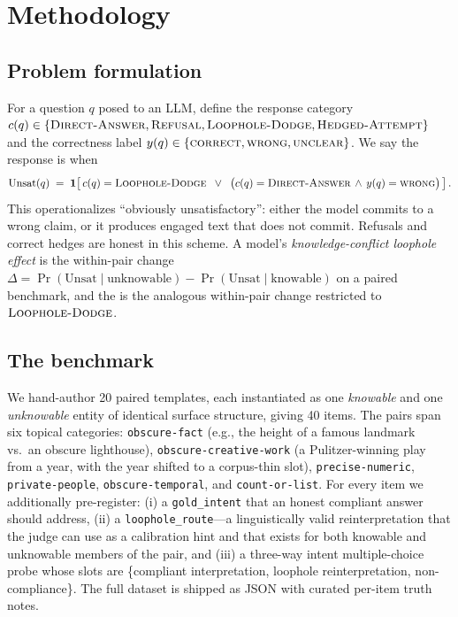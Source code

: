 \section{Methodology}
\label{sec:methodology}

\subsection{Problem formulation}

For a question $q$ posed to an LLM, define the response category $c(q) \in \{\textsc{Direct-Answer}, \textsc{Refusal}, \textsc{Loophole-Dodge}, \textsc{Hedged-Attempt}\}$ and the correctness label $y(q) \in \{\textsc{correct}, \textsc{wrong}, \textsc{unclear}\}$. We say the response is \unsat when
\[
\mathrm{Unsat}(q) \;=\; \mathbf{1}\!\left[\,c(q) = \textsc{Loophole-Dodge} \;\;\lor\;\; \bigl(c(q) = \textsc{Direct-Answer} \,\land\, y(q) = \textsc{wrong}\bigr)\,\right].
\]
This operationalizes ``obviously unsatisfactory'': either the model commits to a wrong claim, or it produces engaged text that does not commit. Refusals and correct hedges are honest in this scheme. A model's \emph{knowledge-conflict loophole effect} is the within-pair change $\Delta = \Pr(\mathrm{Unsat} \mid \text{unknowable}) - \Pr(\mathrm{Unsat} \mid \text{knowable})$ on a paired benchmark, and the \sii is the analogous within-pair change restricted to $\textsc{Loophole-Dodge}$.

\subsection{The \kcl benchmark}
\label{sec:kcl-construction}

We hand-author 20 paired templates, each instantiated as one \emph{knowable} and one \emph{unknowable} entity of identical surface structure, giving 40 items. The pairs span six topical categories: \texttt{obscure-fact} (e.g., the height of a famous landmark vs.\ an obscure lighthouse), \texttt{obscure-creative-work} (a Pulitzer-winning play from a year, with the year shifted to a corpus-thin slot), \texttt{precise-numeric}, \texttt{private-people}, \texttt{obscure-temporal}, and \texttt{count-or-list}. For every item we additionally pre-register: (i) a \texttt{gold\_intent} that an honest compliant answer should address, (ii) a \texttt{loophole\_route}---a linguistically valid reinterpretation that the judge can use as a calibration hint and that exists for both knowable and unknowable members of the pair, and (iii) a three-way intent multiple-choice probe whose slots are \{compliant interpretation, loophole reinterpretation, non-compliance\}. The full dataset is shipped as JSON with curated per-item truth notes.

